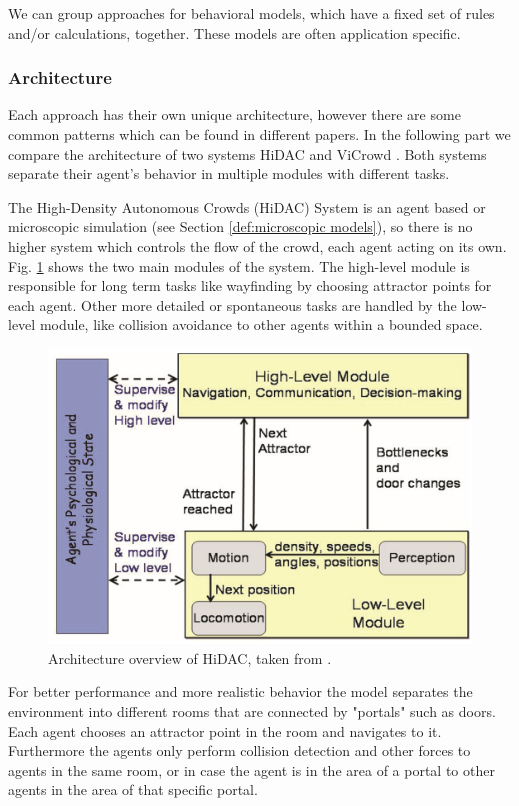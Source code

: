 \documentclass{acmsiggraph}               %
\begin{document}
We can group approaches for behavioral models, which have a fixed set of rules and/or calculations, together. These models are often application specific.

\subsubsection{Architecture}

Each approach has their own unique architecture, however there are some common patterns which can be found in different papers. In the following part we compare the architecture of two systems HiDAC \cite{pelechano_controlling_2007} and ViCrowd \cite{musse_hierarchical_2001}. Both systems separate their agent's behavior in multiple modules with different tasks.

The High-Density Autonomous Crowds (HiDAC) System  is an agent based or microscopic simulation (see Section \ref{def:microscopic models}), so there is no higher system which controls the flow of the crowd, each agent acting on its own.
Fig. \ref{fig:hidacArchitecture} shows the two main modules of the system. The high-level module is responsible for long term tasks like wayfinding by choosing attractor points for each agent. Other more detailed or spontaneous tasks are handled by the low-level module, like collision avoidance to other agents  within a bounded space.
\begin{figure}[h]
  \centering
  \includegraphics[width=1\linewidth]{images/hidac-architacture.png}
  \caption{Architecture overview of HiDAC, taken from \protect\cite{pelechano_controlling_2007}.}
  \label{fig:hidacArchitecture}
\end{figure}
For better performance and more realistic behavior the model separates the environment into different rooms that are connected by "portals" such as doors. Each agent chooses an attractor point in the room and navigates to it. Furthermore the agents only perform collision detection and other forces to agents in the same room, or in case the agent is in the area of a portal to other agents in the area of that specific portal.
\end{document}
